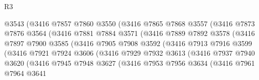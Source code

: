 \begin{lexlean}{R3}
\begin{coremodule}
                          @3543
                          (@3416
                            @7857
                            @7860
                            @3550
                            (@3416
                              @7865
                              @7868
                              @3557
                              (@3416
                                @7873
                                @7876
                                @3564
                                (@3416
                                  @7881
                                  @7884
                                  @3571
                                  (@3416
                                    @7889
                                    @7892
                                    @3578
                                    (@3416
                                      @7897
                                      @7900
                                      @3585
                                      (@3416
                                        @7905
                                        @7908
                                        @3592
                                        (@3416
                                          @7913
                                          @7916
                                          @3599
                                          (@3416
                                            @7921
                                            @7924
                                            @3606
                                            (@3416
                                              @7929
                                              @7932
                                              @3613
                                              (@3416
                                                @7937
                                                @7940
                                                @3620
                                                (@3416
                                                  @7945
                                                  @7948
                                                  @3627
                                                  (@3416
                                                    @7953
                                                    @7956
                                                    @3634
                                                    (@3416
                                                      @7961
                                                      @7964
                                                      @3641

\end{coremodule}
\end{lexlean}
